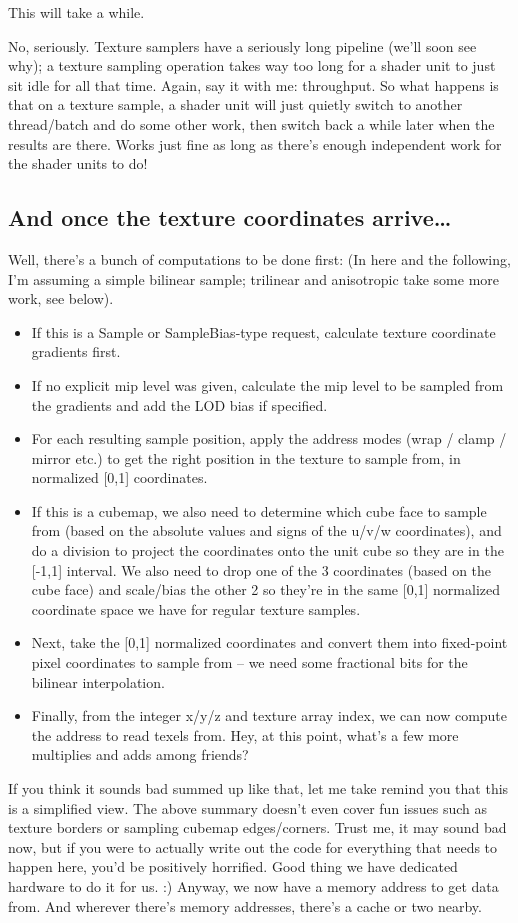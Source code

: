 \documentclass[12pt]{article}
\begin{document}
This will take a while.

No, seriously. Texture samplers have a seriously long pipeline (we’ll soon see why); a texture sampling operation takes way too long for a shader unit to just sit idle for all that time. Again, say it with me: throughput. So what happens is that on a texture sample, a shader unit will just quietly switch to another thread/batch and do some other work, then switch back a while later when the results are there. Works just fine as long as there’s enough independent work for the shader units to do!

\subsection{And once the texture coordinates arrive…}
\label{sec:org13c8e24}

Well, there’s a bunch of computations to be done first: (In here and the following, I’m assuming a simple bilinear sample; trilinear and anisotropic take some more work, see below).

\begin{itemize}
\item If this is a Sample or SampleBias-type request, calculate texture coordinate gradients first.
\item If no explicit mip level was given, calculate the mip level to be sampled from the gradients and add the LOD bias if specified.
\item For each resulting sample position, apply the address modes (wrap / clamp / mirror etc.) to get the right position in the texture to sample from, in normalized [0,1] coordinates.
\item If this is a cubemap, we also need to determine which cube face to sample from (based on the absolute values and signs of the u/v/w coordinates), and do a division to project the coordinates onto the unit cube so they are in the [-1,1] interval. We also need to drop one of the 3 coordinates (based on the cube face) and scale/bias the other 2 so they’re in the same [0,1] normalized coordinate space we have for regular texture samples.
\item Next, take the [0,1] normalized coordinates and convert them into fixed-point pixel coordinates to sample from – we need some fractional bits for the bilinear interpolation.
\item Finally, from the integer x/y/z and texture array index, we can now compute the address to read texels from. Hey, at this point, what’s a few more multiplies and adds among friends?
\end{itemize}
If you think it sounds bad summed up like that, let me take remind you that this is a simplified view. The above summary doesn’t even cover fun issues such as texture borders or sampling cubemap edges/corners. Trust me, it may sound bad now, but if you were to actually write out the code for everything that needs to happen here, you’d be positively horrified. Good thing we have dedicated hardware to do it for us. :) Anyway, we now have a memory address to get data from. And wherever there’s memory addresses, there’s a cache or two nearby.
\end{document}
